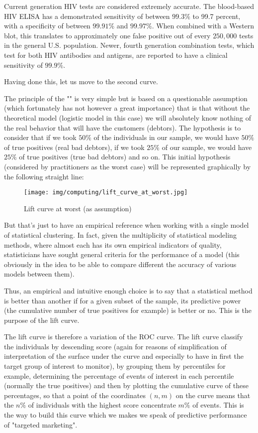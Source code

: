 	\begin{tcolorbox}[title=Remark,colframe=black,arc=10pt]
	Current generation HIV tests are considered extremely accurate. The blood-based HIV ELISA has a demonstrated sensitivity of between $99.3\%$  to 99.7 percent, with a specificity of between $99.91\%$ and $99.97\%$. When combined with a Western blot, this translates to approximately one false positive out of every $250,000$ tests in the general U.S. population. Newer, fourth generation combination tests, which test for both HIV antibodies and antigens, are reported to have a clinical sensitivity of $99.9\%$.
	\end{tcolorbox}
	
	Having done this, let us move to the second curve.
	
	The principle of the "" is very simple but is based on a questionable assumption (which fortunately has not however a great importance) that is that without the theoretical model (logistic model in this case) we will absolutely know nothing of the real behavior that will have the customers (debtors). The hypothesis is to consider that if we took $50\%$ of the individuals in our sample, we would have $50\%$ of true positives (real bad debtors), if we took $25\%$ of our sample, we would have $25\%$ of true positives (true bad debtors) and so on. This initial hypothesis (considered by practitioners as the worst case) will be represented graphically by the following straight line:
	\begin{figure}[H]
		\centering
		\texttt{[image: img/computing/lift\_curve\_at\_worst.jpg]}
		\caption[]{Lift curve at worst (as assumption)}
	\end{figure}
	But that's just to have an empirical reference when working with a single model of statistical clustering. In fact, given the multiplicity of statistical modeling methods, where almost each has its own empirical indicators of quality, statisticians have sought general criteria for the performance of a model (this obviously in the idea to be able to compare different the accuracy of various models between them).
	
	Thus, an empirical and intuitive enough choice is to say that a statistical method is better than another if for a given subset of the sample, its predictive power (the cumulative number of true positives for example) is better or no. This is the purpose of the lift curve.
	
	The lift curve is therefore a variation of the ROC curve. The lift curve classify the individuals by descending score (again for reasons of simplification of interpretation of the surface under the curve and especially to have in first the target group of interest to monitor), by grouping them by percentiles for example, determining the percentage of events of interest in each percentile (normally the true positives) and then by plotting the cumulative curve of these percentages, so that a point of the coordinates $(n, m)$ on the curve means that the $n\%$ of individuals with the highest score concentrate $m\%$ of events. This is the way to build this curve which we makes we speak of predictive performance of "targeted marketing".
	
